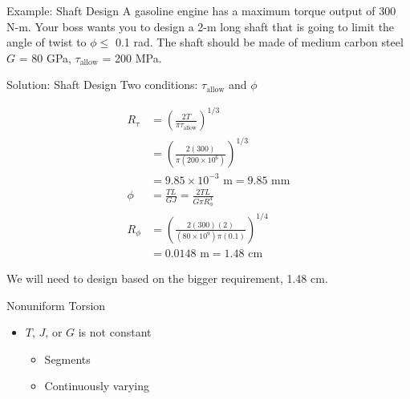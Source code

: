 \documentclass[10pt, svgnames]{beamer}
\begin{document}
\begin{frame}[label={sec:org0ecc5cb}]{Example: Shaft Design}
A gasoline engine has a maximum torque output of 300 N-m. Your boss wants you to design a 2-m long shaft that is going to limit the angle of twist to \(\phi \leqslant\) 0.1 rad. The shaft should be made of medium carbon steel \(G\) = 80 GPa, \(\tau_{\text{allow}}\) = 200 MPa.
\end{frame}

\begin{frame}[label={sec:orgc07e22b}]{Solution: Shaft Design}
Two conditions: \(\tau_{\text{allow}}\) and \(\phi\)

\begin{align*}
  R_{\tau} &= \left( \frac{2T}{\pi \tau_{\text{allow}}} \right)^{1/3} \\
           &= \left( \frac{2(300)}{\pi (200 \times 10^6)} \right)^{1/3} \\
           &= 9.85 \times 10^{-3} \text{ m} = 9.85 \text{ mm} \\
  \phi &= \frac{TL}{GJ} = \frac{2TL}{G \pi R_{\phi}^{4}} \\
  R_{\phi} &= \left( \frac{2(300)(2)}{(80 \times 10^{9})\pi(0.1)} \right)^{1/4} \\
           &= 0.0148 \text{ m} = 1.48 \text{ cm}
\end{align*}

We will need to design based on the bigger requirement, 1.48 cm.
\end{frame}

\begin{frame}[label={sec:orgb5b21df}]{Nonuniform Torsion}
\begin{itemize}
\item \(T\), \(J\), or \(G\) is not constant

\begin{itemize}
\item Segments

\item Continuously varying
\end{itemize}
\end{itemize}
\end{frame}
\end{document}
